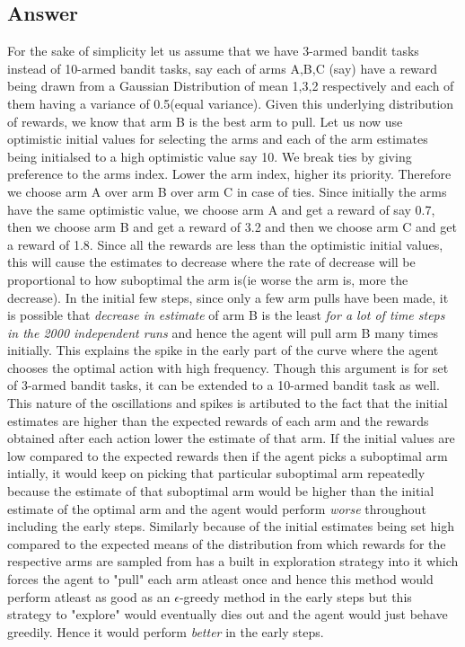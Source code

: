 \documentclass[english]{article}
\begin{document}
\subsection{Answer}
For the sake of simplicity let us assume that we have 3-armed bandit tasks instead of 10-armed bandit tasks, say each of arms A,B,C (say) have a reward being drawn from a Gaussian Distribution of mean 1,3,2 respectively and each of them having a variance of 0.5(equal variance). Given this underlying distribution of rewards, we know that arm B is the best arm to pull. Let us now use optimistic initial values for selecting the arms and each of the arm estimates being initialsed to a high optimistic value say 10. We break ties by giving preference to the arms index. Lower the arm index, higher its priority. Therefore we choose arm A over arm B over arm C in case of ties.
\newline
\newline
Since initially the arms have the same optimistic value, we choose arm A and get a reward of say 0.7, then we choose arm B and get a reward of 3.2 and then we choose arm C and get a reward of 1.8. Since all the rewards are less than the optimistic initial values, this will cause the estimates to decrease where the rate of decrease will be proportional to how suboptimal the arm is(ie worse the arm is, more the decrease). In the initial few steps, since only a few arm pulls have been made, it is possible that \emph{decrease in estimate} of arm B is the least \emph{for a lot of time steps in the 2000 independent runs} and hence the agent will pull arm B many times initially. This explains the spike in the early part of the curve where the agent chooses the optimal action with high frequency. Though this argument is for set of 3-armed bandit tasks, it can be extended to a 10-armed bandit task as well. This nature of the oscillations and spikes is artibuted to the fact that the initial estimates are higher than the expected rewards of each arm and the rewards obtained after each action lower the estimate of that arm.
\newline	
\newline
If the initial values are low compared to the expected rewards then if the agent picks a suboptimal arm intially, it would keep on picking that particular suboptimal arm repeatedly because the estimate of that suboptimal arm would be higher than the initial estimate of the optimal arm and the agent would perform \emph{worse} throughout including the early steps. 
\newline 
\newline
Similarly because of the initial estimates being set high compared to the expected means of the distribution from which rewards for the respective arms are sampled from has a built in exploration strategy into it which forces the agent to "pull" each arm atleast once and hence this method would perform atleast as good as an $\epsilon$-greedy method in the early steps but this strategy to "explore" would eventually dies out and the agent would just behave greedily. Hence it would perform \emph{better} in the early steps.
\end{document}
